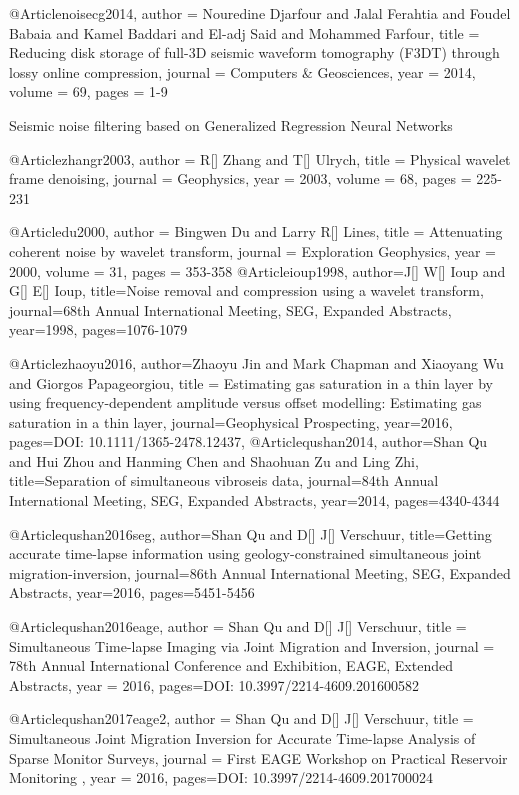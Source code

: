  @Article{noisecg2014,
  author = 	 {Nouredine Djarfour and Jalal Ferahtia and Foudel Babaia and Kamel Baddari and El-adj Said and Mohammed Farfour},
  title = 	 {Reducing disk storage of full-3D seismic waveform tomography (F3DT) through lossy online compression},
  journal = 	 { Computers \& Geosciences},
  year = 	 2014,
  volume = 	 69,
  pages = 	 {1-9}} 
  
Seismic noise filtering based on Generalized Regression Neural Networks


@Article{zhangr2003,
  author = 	 {R[] Zhang and T[] Ulrych},
  title = 	 {Physical wavelet frame denoising},
  journal = 	 {Geophysics},
  year = 	 2003,
  volume = 	 68,
  pages = 	 {225-231}}

@Article{du2000,
  author = 	 {Bingwen Du and Larry R[] Lines},
  title = 	 {Attenuating coherent noise by wavelet transform},
  journal = 	 {Exploration Geophysics},
  year = 	 2000,
  volume = 	 31,
  pages = 	 {353-358}}
@Article{ioup1998,
  author={J[] W[] Ioup and G[] E[] Ioup},
  title={Noise removal and compression using a wavelet transform},
  journal={68th Annual International Meeting, SEG, Expanded Abstracts},
  year=1998,
  pages={1076-1079}
}

@Article{zhaoyu2016,
  author={Zhaoyu Jin and Mark Chapman and Xiaoyang Wu and Giorgos Papageorgiou},
  title = {Estimating gas saturation in a thin layer by using frequency-dependent amplitude versus offset modelling: Estimating gas saturation in a thin layer},
  journal={Geophysical Prospecting},
  year=2016,
  pages={DOI: 10.1111/1365-2478.12437},
}
@Article{qushan2014,
  author={Shan Qu and Hui Zhou and Hanming Chen and Shaohuan Zu and Ling Zhi},
  title={Separation of simultaneous vibroseis data},
  journal={84th Annual International Meeting, SEG, Expanded Abstracts},
  year=2014,
  pages={4340-4344}
}

@Article{qushan2016seg,
  author={Shan Qu and D[] J[] Verschuur},
  title={Getting accurate time-lapse information using geology-constrained simultaneous joint migration-inversion},
  journal={86th Annual International Meeting, SEG, Expanded Abstracts},
  year=2016,
  pages={5451-5456}
}


@Article{qushan2016eage,
  author = 	 {Shan Qu and D[] J[] Verschuur},
  title = 	 {Simultaneous Time-lapse Imaging via Joint Migration and Inversion},
  journal = 	 { 78th Annual International Conference and Exhibition, EAGE, Extended Abstracts},
  year = 	 2016,
  pages={DOI: 10.3997/2214-4609.201600582}}
  

@Article{qushan2017eage2,
  author = 	 {Shan Qu and D[] J[] Verschuur},
  title = 	 {Simultaneous Joint Migration Inversion for Accurate Time-lapse Analysis of Sparse Monitor Surveys},
  journal = 	 { First EAGE Workshop on Practical Reservoir Monitoring },
  year = 	 2016,
  pages={DOI: 10.3997/2214-4609.201700024}}
  
